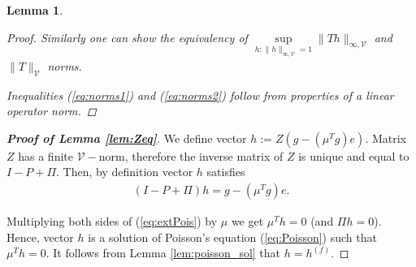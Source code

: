 \documentclass[11pt]{article}
\newcommand{\V}{\mathcal{V}}
\newtheorem{lemma}{Lemma}
\theoremstyle{definition}
\numberwithin{equation}{section}
\begin{document}
\begin{lemma}
\begin{proof}
Similarly one can show the equivalency of  $\sup\limits_{h:\|h\|_{\infty, \V} = 1} \| Th \|_{\infty, \V}$ and $\|T\|_\V$ norms.

Inequalities (\ref{eq:norms1}) and (\ref{eq:norms2}) follow from properties of a linear operator norm.
\end{proof}
\end{lemma}

 \begin{proof}[\textbf{Proof of Lemma \ref{lem:Zeq}}]
  We define vector $h:= Z\left(g -(\mu^T g) e\right)$. Matrix $Z$ has a finite $\V-$norm, therefore the inverse matrix of $Z$ is unique and equal to $I-P+\Pi$. Then, by definition vector $h$ satisfies
\begin{align}\label{eq:extPois}
(I-P+\Pi) h = g -(\mu^T g) e.
\end{align}

Multiplying both sides of (\ref{eq:extPois}) by $\mu$ we get $\mu^T h = 0$ (and $\Pi h = 0$). Hence, vector $h$ is a solution of Poisson's equation  (\ref{eq:Poisson}) such that $\mu^T h = 0$. It follows from Lemma \ref{lem:poisson_sol} that $h=h^{(f)}.$
 \end{proof}
\end{document}

